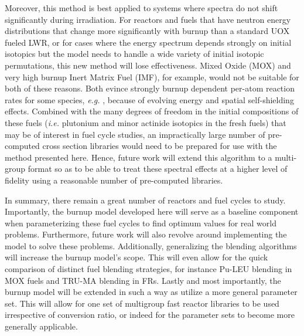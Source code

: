 Moreover, this method is best applied to systems where spectra do not shift significantly during 
irradiation.  For reactors and fuels that have neutron energy distributions that change more 
significantly with burnup than a standard UOX fueled LWR, or for cases where the energy spectrum 
depends strongly on initial isotopics but the model needs to handle a wide variety of initial 
isotopic permutations, this new method will lose effectiveness.  Mixed Oxide (MOX) and very 
high burnup Inert Matrix Fuel (IMF), for example, would not be suitable for both of these reasons.  
Both evince strongly burnup dependent per-atom reaction rates for some species, 
\emph{e.g.} , because of evolving energy and spatial self-shielding effects.  
Combined with the many degrees of freedom in the initial compositions of these fuels 
(\emph{i.e.} plutonium and minor actinide isotopics in the fresh fuels) that may be of interest 
in fuel cycle studies, an impractically large number of pre-computed cross section libraries 
would need to be prepared for use with the method presented here.  Hence, future work will extend 
this algorithm to a multi-group format so as to be able to treat these spectral effects at a higher 
level of fidelity using a reasonable number of pre-computed libraries.

In summary, there remain a great number of reactors and fuel cycles to study.  Importantly, the 
burnup model developed here will serve as a baseline component when parameterizing these fuel 
cycles to find optimum values for real world problems.  Furthermore, future work will also 
revolve around implementing the model to solve these problems.  Additionally, generalizing 
the blending algorithms will increase the burnup model's scope.  This will even allow for 
the quick comparison of distinct fuel blending strategies, for instance Pu-LEU blending in 
MOX fuels and TRU-MA blending in FRs.  Lastly and most importantly, the burnup model will 
be extended in such a way as utilize a more general parameter set.  This will allow for one 
set of multigroup fast reactor libraries to be used irrespective of conversion ratio, or 
indeed for the parameter sets to become more generally applicable.
